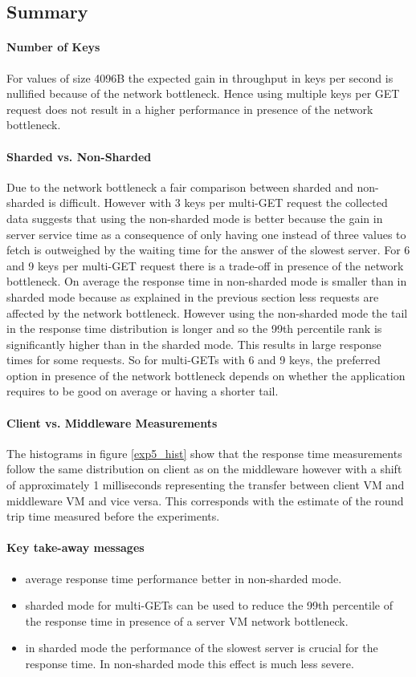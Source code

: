 \documentclass[report.tex]{subfiles}
\begin{document}
\subsection{Summary}

\paragraph{Number of Keys}
For values of size 4096B the expected gain in throughput in keys per second is nullified because of the network bottleneck. Hence using multiple keys per GET request does not result in a higher performance in presence of the network bottleneck.

\paragraph{Sharded vs. Non-Sharded}
Due to the network bottleneck a fair comparison between sharded and non-sharded is difficult. 
However with 3 keys per multi-GET request the collected data suggests that using the non-sharded mode is better because the gain in server service time as a consequence of only having one instead of three values to fetch is outweighed by the waiting time for the answer of the slowest server. For 6 and 9 keys per multi-GET request there is a trade-off in presence of the network bottleneck. On average the response time in non-sharded mode is smaller than in sharded mode because as explained in the previous section less requests are affected by the network bottleneck. However using the non-sharded mode the tail in the response time distribution is longer and so the 99th percentile rank is significantly higher than in the sharded mode. This results in large response times for some requests.
So for multi-GETs with 6 and 9 keys, the preferred option in presence of the network bottleneck depends on whether the application requires to be good on average or having a shorter tail. 

\paragraph{Client vs. Middleware Measurements}
The histograms in figure \ref{exp5_hist} show that the response time measurements follow the same distribution on client as on the middleware however with a shift of approximately 1 milliseconds representing the transfer between client VM and middleware VM and vice versa. This corresponds with the estimate of the round trip time measured before the experiments.
\paragraph{Key take-away messages}
\begin{itemize}
	\vitemsep
	\item average response time performance better in non-sharded mode.
	\item sharded mode for multi-GETs can be used to reduce the 99th percentile of the response time in presence of a server VM network bottleneck.
	\item in sharded mode the performance of the slowest server is crucial for the response time. In non-sharded mode this effect is much less severe.
\end{itemize}
\end{document}
